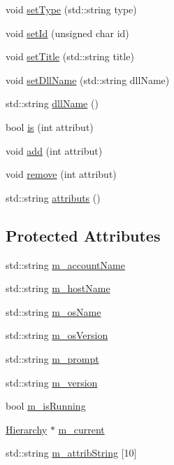 \begin{DoxyCompactItemize}
\item 
void \hyperlink{classObject_aae534cc9d982bcb9b99fd505f2e103a5}{setType} (std::string type)
\item 
void \hyperlink{classObject_a398fe08cba594a0ce6891d59fe4f159f}{setId} (unsigned char id)
\item 
void \hyperlink{classObject_a89557dbbad5bcaa02652f5d7fa35d20f}{setTitle} (std::string title)
\item 
void \hyperlink{classObject_a870c5af919958c2136623b2d7816d123}{setDllName} (std::string dllName)
\item 
std::string \hyperlink{classObject_a2e3947f2870094c332d7454117f3ec63}{dllName} ()
\item 
bool \hyperlink{classAttrib_a704f26af560909ad22065083bb7d4c34}{is} (int attribut)
\item 
void \hyperlink{classAttrib_a235f773af19c900264a190b00a3b4ad7}{add} (int attribut)
\item 
void \hyperlink{classAttrib_a7d4ef7e32d93cb287792b87b857e79f3}{remove} (int attribut)
\item 
std::string \hyperlink{classAttrib_aee7bbf16b144887f196e1341b24f8a26}{attributs} ()
\end{DoxyCompactItemize}
\subsection*{Protected Attributes}
\begin{DoxyCompactItemize}
\item 
std::string \hyperlink{classApplication_ac6ecd97be07092147986a7a5965c54ec}{m\_\-accountName}
\item 
std::string \hyperlink{classApplication_a20094c2bf311e2046942eeeec4a11f02}{m\_\-hostName}
\item 
std::string \hyperlink{classApplication_a59f90c6ff4ee3db646ca656c71cc77e7}{m\_\-osName}
\item 
std::string \hyperlink{classApplication_a17949f767d2598e92acb0885bb399dc0}{m\_\-osVersion}
\item 
std::string \hyperlink{classApplication_a84f3f07f42ad77ad46cc8ef42d609948}{m\_\-prompt}
\item 
std::string \hyperlink{classApplication_acbbdbd17a3a66782c54dbbe58a9ca8d8}{m\_\-version}
\item 
bool \hyperlink{classApplication_ae316ea43e74cc0d536dcbb16b2fbb974}{m\_\-isRunning}
\item 
\hyperlink{classHierarchy}{Hierarchy} $\ast$ \hyperlink{classApplication_ab0fd877a3c66c41b22109863e1719ccd}{m\_\-current}
\item 
std::string \hyperlink{classAttrib_a3414521d7a82476e874b25a5407b5e63}{m\_\-attribString} \mbox{[}10\mbox{]}
\end{DoxyCompactItemize}

